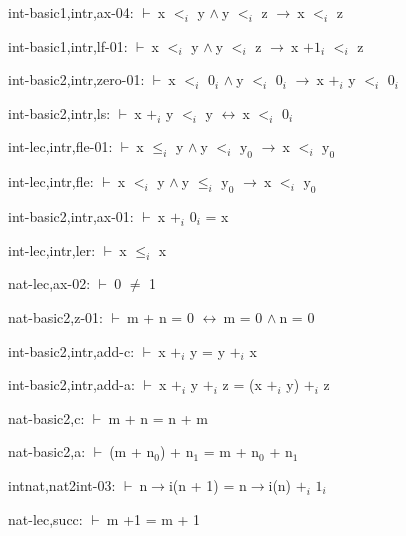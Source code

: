 \documentclass[a4paper]{article}
\newcommand{\Fol}{\mbox{$\vdash\ $}}
\newcommand{\And}{\mbox{$\wedge\ $}}
\newcommand{\Imp}{\mbox{$\rightarrow\ $}}
\newcommand{\Equiv}{\mbox{$\leftrightarrow\ $}}
\begin{document}
int-basic1,intr,ax-04: 
 \Fol x $\mbox{$<$}_{i}$ y \And y $\mbox{$<$}_{i}$ z \Imp x $\mbox{$<$}_{i}$ z



int-basic1,intr,lf-01: 
 \Fol x $\mbox{$<$}_{i}$ y \And y $\mbox{$<$}_{i}$ z \Imp x $\mbox{+1}_{i}$ $\mbox{$<$}_{i}$ z



int-basic2,intr,zero-01: 
 \Fol x $\mbox{$<$}_{i}$ $\mbox{0}_{i}$ \And y $\mbox{$<$}_{i}$ $\mbox{0}_{i}$ \Imp x $\mbox{+}_{i}$ y $\mbox{$<$}_{i}$ $\mbox{0}_{i}$



int-basic2,intr,ls: 
 \Fol x $\mbox{+}_{i}$ y $\mbox{$<$}_{i}$ y \Equiv x $\mbox{$<$}_{i}$ $\mbox{0}_{i}$



int-lec,intr,fle-01: 
 \Fol x $\mbox{$\le$}_{i}$ y \And y $\mbox{$<$}_{i}$ $\mbox{y}_{0}$ \Imp x $\mbox{$<$}_{i}$ $\mbox{y}_{0}$



int-lec,intr,fle: 
 \Fol x $\mbox{$<$}_{i}$ y \And y $\mbox{$\le$}_{i}$ $\mbox{y}_{0}$ \Imp x $\mbox{$<$}_{i}$ $\mbox{y}_{0}$



int-basic2,intr,ax-01: 
 \Fol x $\mbox{+}_{i}$ $\mbox{0}_{i}$ = x



int-lec,intr,ler: 
 \Fol x $\mbox{$\le$}_{i}$ x



nat-lec,ax-02: 
 \Fol 0 $\neq$ 1



nat-basic2,z-01: 
 \Fol m + n = 0 \Equiv m = 0 \And n = 0



int-basic2,intr,add-c: 
 \Fol x $\mbox{+}_{i}$ y = y $\mbox{+}_{i}$ x



int-basic2,intr,add-a: 
 \Fol x $\mbox{+}_{i}$ y $\mbox{+}_{i}$ z = (x $\mbox{+}_{i}$ y) $\mbox{+}_{i}$ z



nat-basic2,c: 
 \Fol m + n = n + m



nat-basic2,a: 
 \Fol (m + $\mbox{n}_{0}$) + $\mbox{n}_{1}$ = m + $\mbox{n}_{0}$ + $\mbox{n}_{1}$



intnat,nat2int-03: 
 \Fol n$\to$i(n + 1) = n$\to$i(n) $\mbox{+}_{i}$ $\mbox{1}_{i}$



nat-lec,succ: 
 \Fol m +1 = m + 1
\end{document}
